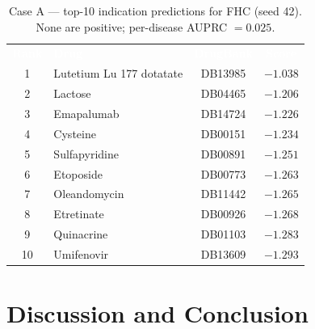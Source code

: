 \documentclass[conference]{IEEEtran}
\newcommand{\hdr}[1]{\textcolor{white}{\textbf{#1}}}
\begin{document}
\begin{table}[t]
\centering
\caption{Case A --- top-10 indication predictions for FHC (seed 42). None are
positive; per-disease AUPRC $=0.025$.}
\label{tab:caseA}
\renewcommand{\arraystretch}{1.2}
\begin{tabular}{c l c c}
\rowcolor{brandindigo}
\hdr{Rank} & \hdr{Drug} & \hdr{DrugBank} & \hdr{Score}\\
1  & Lutetium Lu 177 dotatate & DB13985 & $-1.038$\\
\rowcolor{rowalt}
2  & Lactose       & DB04465 & $-1.206$\\
3  & Emapalumab    & DB14724 & $-1.226$\\
\rowcolor{rowalt}
4  & Cysteine      & DB00151 & $-1.234$\\
5  & Sulfapyridine & DB00891 & $-1.251$\\
\rowcolor{rowalt}
6  & Etoposide     & DB00773 & $-1.263$\\
7  & Oleandomycin  & DB11442 & $-1.265$\\
\rowcolor{rowalt}
8  & Etretinate    & DB00926 & $-1.268$\\
9  & Quinacrine    & DB01103 & $-1.283$\\
\rowcolor{rowalt}
10 & Umifenovir    & DB13609 & $-1.293$\\
\end{tabular}
\end{table}

\section{Discussion and Conclusion}
\end{document}
